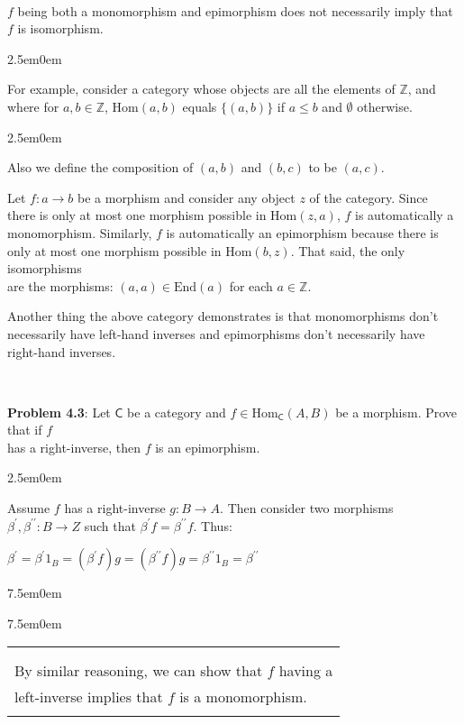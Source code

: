 \documentclass{book}
\newcommand{\pracOne}{
   \color{BrickRed}%
   \fontsize{13}{15}\selectfont%
}
\newcommand{\pracTwo}{
   \color{Orange}%
   \fontsize{12}{14}\selectfont%
}
\newcommand{\exOne}{%
   \color{Purple}%
   \fontsize{14}{16}\selectfont%
}
\newcommand{\exTwo}{%
   \color{RedViolet}%
   \fontsize{13}{15}\selectfont%
}
\newcommand{\exP}{%
   \color{VioletRed}%
   \fontsize{12}{14}\selectfont%
}
\newenvironment{myIndent}{%
   \begin{adjustwidth}{2.5em}{0em}%
}{%
   \end{adjustwidth}%
}
\newenvironment{myTindent}{%
   \begin{adjustwidth}{7.5em}{0em}%
}{%
   \end{adjustwidth}%
}
\newcommand{\pprime}{{\prime\prime}}
\newcommand{\myHom}{\mathrm{Hom}}
\newcommand{\myEnd}{\mathrm{End}}
\newcommand{\mcateg}[1]{{\bm{\mathsf{#1}}}}
\newcommand{\mySepTwo}[1][.]{%
   {\noindent\color{#1}{\rule{6.5in}{0.5mm}}}\\%
}
\newenvironment{myClosureOne}[2][.]{%
   \color{#1}%
   \begin{tabular}{|p{#2in}|} \hline \\%
}{%
   \\ \hline \end{tabular}%
}
\newcommand{\retTwo}{\hfill\bigbreak}
\begin{document}
\exOne\mySepTwo

$f$ being both a monomorphism and epimorphism does not necessarily imply that\\ $f$ is isomorphism.
{\begin{myIndent} \exTwo
   For example, consider a category whose objects are all the elements of $\mathbb{Z}$, and\\ where for $a, b \in \mathbb{Z}$, $\myHom(a, b)$ equals $\{(a, b)\}$ if $a \leq b$ and $\emptyset$ otherwise.
   {\begin{myIndent}\exP
      Also we define the composition of $(a, b)$ and $(b, c)$ to be $(a, c)$.
   \end{myIndent}}

   \newpage

   Let $f: a \longrightarrow b$ be a morphism and consider any object $z$ of the category. Since\\ there is only at most one morphism possible in $\myHom(z, a)$, $f$ is automatically a\\ monomorphism. Similarly, $f$ is automatically an epimorphism because there is\\ only at most one morphism possible in $\myHom(b, z)$. That said, the only isomorphisms\\ are the morphisms: $(a, a) \in \myEnd(a)$ for each $a \in \mathbb{Z}$.\retTwo
\end{myIndent}}

Another thing the above category demonstrates is that monomorphisms don't\\ necessarily have left-hand inverses and epimorphisms don't necessarily have\\ right-hand inverses.

\mySepTwo

\pracOne
\textbf{Problem 4.3}: Let $\mcateg{C}$ be a category and $f \in \myHom_\mcateg{C}(A, B)$ be a morphism. Prove that if $f$\\ has a right-inverse, then $f$ is an epimorphism.\retTwo

{\begin{myIndent} \pracTwo
   Assume $f$ has a right-inverse $g: B \longrightarrow A$. Then consider two morphisms\\ $\beta^\prime, \beta^\pprime: B \longrightarrow Z$ such that $\beta^\prime f = \beta^\pprime f$. Thus:

   {\center $ \beta^\prime = \beta^\prime1_B = (\beta^\prime f) g = (\beta^\pprime f) g = \beta^\pprime 1_B = \beta^\pprime$ \retTwo\par}

   
   \begin{myTindent}\begin{myTindent}
      \begin{myClosureOne}{3.35}
         \\ [-22pt] By similar reasoning, we can show that $f$ having a\\ left-inverse implies that $f$ is a monomorphism.\\ [-10pt]
      \end{myClosureOne}
   \end{myTindent}\end{myTindent}
\end{myIndent}}
\end{document}
